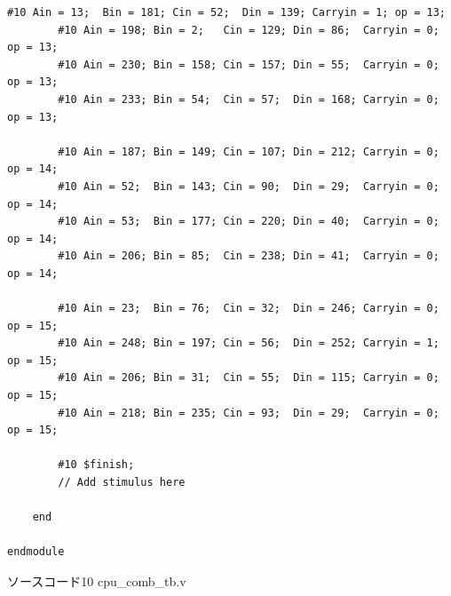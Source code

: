\documentclass[12pt]{jreport}
\begin{document}
\begin{center}
\begin{lstlisting}[basicstyle=\ttfamily\footnotesize, frame=single]
        #10 Ain = 13;  Bin = 181; Cin = 52;  Din = 139; Carryin = 1; op = 13;
        #10 Ain = 198; Bin = 2;   Cin = 129; Din = 86;  Carryin = 0; op = 13;
        #10 Ain = 230; Bin = 158; Cin = 157; Din = 55;  Carryin = 0; op = 13;
        #10 Ain = 233; Bin = 54;  Cin = 57;  Din = 168; Carryin = 0; op = 13;
  
        #10 Ain = 187; Bin = 149; Cin = 107; Din = 212; Carryin = 0; op = 14;
        #10 Ain = 52;  Bin = 143; Cin = 90;  Din = 29;  Carryin = 0; op = 14;
        #10 Ain = 53;  Bin = 177; Cin = 220; Din = 40;  Carryin = 0; op = 14;
        #10 Ain = 206; Bin = 85;  Cin = 238; Din = 41;  Carryin = 0; op = 14;

        #10 Ain = 23;  Bin = 76;  Cin = 32;  Din = 246; Carryin = 0; op = 15;
        #10 Ain = 248; Bin = 197; Cin = 56;  Din = 252; Carryin = 1; op = 15;
        #10 Ain = 206; Bin = 31;  Cin = 55;  Din = 115; Carryin = 0; op = 15;
        #10 Ain = 218; Bin = 235; Cin = 93;  Din = 29;  Carryin = 0; op = 15;
        
        #10 $finish;
        // Add stimulus here

    end
      
endmodule
            \end{lstlisting}
            ソースコード10 cpu\_comb\_tb.v
        \end{center}
\end{document}
